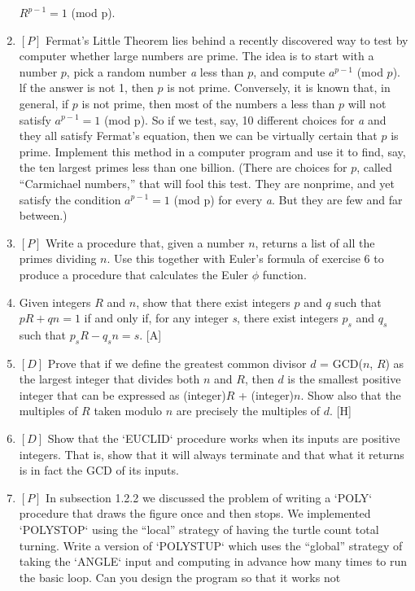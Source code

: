 \documentclass{book}
\begin{document}
\begin{enumerate}
$R^{p-1} = 1$ (mod p).  
\item $[P]$ Fermat's Little Theorem lies behind a recently discovered way to
test by computer whether large numbers are prime. The idea is to start
with a number $p$, pick a random number {\em a} less than $p$, and compute
$a^{p-1}$ (mod $p$). lf the answer is not 1, then $p$ is not prime. Conversely,
it is known that, in general, if $p$ is not prime, then most of the numbers
a less than $p$ will not satisfy $a^{p-1} = 1$ (mod p). So if we test, say, 10
different choices for {\em a} and they all satisfy Fermat's equation, then we
can be virtually certain that $p$ is prime. Implement this method in a
computer program and use it to find, say, the ten largest primes less
than one billion. (There are choices for $p$, called ``Carmichael numbers,''
that will fool this test. They are nonprime, and yet satisfy the condition
$a^{p-1} = 1$ (mod p) for every {\em a}. But they are few and far between.)
\item $[P]$ Write a procedure that, given a number $n$, returns a list of all the
primes dividing $n$. Use this together with Euler's formula of exercise 6
to produce a procedure that calculates the Euler $\phi$ function.
\item Given integers $R$ and $n$, show that there exist integers $p$ and $q$ such
that $pR + qn = 1$ if and only if, for any integer {\em s}, there exist integers
$p_s$ and $q_s$ such that $p_sR - q_sn = s$. [A]
\item $[D]$ Prove that if we define the greatest common divisor $d$ =
GCD($n$, $R$) as the largest integer that divides both $n$ and $R$, then $d$ is the
smallest positive integer that can be expressed as (integer)$R$ + (integer)$n$.
Show also that the multiples of $R$ taken modulo $n$ are precisely the
multiples of $d$. [H]
\item $[D]$ Show that the \textsc{`EUCLID`} procedure works when its inputs are
positive integers. That is, show that it will always terminate and that
what it returns is in fact the GCD of its inputs.
\item $[P]$ In subsection 1.2.2 we discussed the problem of writing a \textsc{`POLY`}
procedure that draws the figure once and then stops. We implemented
\textsc{`POLYSTOP`} using the ``local'' strategy of having the turtle count total
turning. Write a version of \textsc{`POLYSTUP`} which uses the ``global'' strategy
of taking the \textsc{`ANGLE`} input and computing in advance how many times
to run the basic loop. Can you design the program so that it works not

\end{enumerate}
\end{document}

